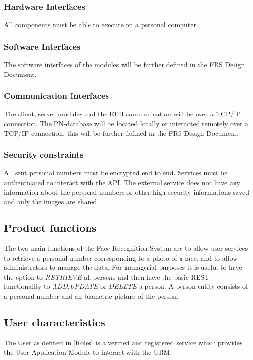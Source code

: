 \documentclass[a4paper,11pt]{article}
\begin{document}
\subsubsection{Hardware Interfaces}
All components must be able to execute on a personal computer.

\subsubsection{Software Interfaces}
The software interfaces of the modules will be further defined in the FRS Design Document.

\subsubsection{Communication Interfaces}
The client, server modules and the EFR communication will be over a TCP/IP connection.
The PN-database will be located locally or interacted remotely over a TCP/IP connection, this will be further defined in the FRS Design Document.

\subsubsection{Security constraints}
All sent personal numbers must be encrypted end to end. Services must be authenticated to interact with the API. The external service does not have any information about the personal numbers or other high security informations saved and only the images are shared.

\subsection{Product functions}
The two main functions of the Face Recognition System are to allow user services to retrieve a personal number corresponding to a photo of a face, and to allow administrators to manage the data.
\newline
\noindent
For managerial purposes it is useful to have the option to \textit{RETRIEVE} all persons and then have the basic REST functionality to \textit{ADD},\textit{UPDATE} or \textit{DELETE} a person. A person entity consists of a personal number and an biometric picture of the person.

\subsection{User characteristics}
The User as defined in \ref{Roles} is a verified and registered service which provides the User Application Module to interact with the URM.
\end{document}
